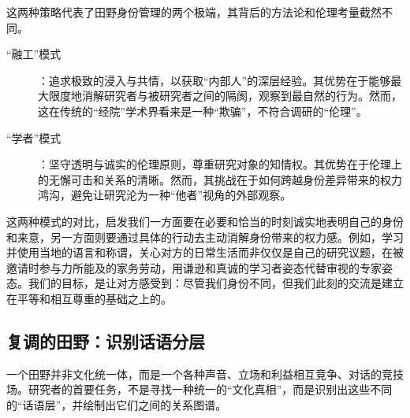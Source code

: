 \documentclass[UTF8]{ctexart}
\begin{document}
这两种策略代表了田野身份管理的两个极端，其背后的方法论和伦理考量截然不同。
\begin{description}
    \item[“融工”模式]：追求极致的浸入与共情，以获取“内部人”的深层经验。其优势在于能够最大限度地消解研究者与被研究者之间的隔阂，观察到最自然的行为。然而，这在传统的“经院”学术界看来是一种“欺骗”，不符合调研的“伦理”。
    \item[“学者”模式]：坚守透明与诚实的伦理原则，尊重研究对象的知情权。其优势在于伦理上的无懈可击和关系的清晰。然而，其挑战在于如何跨越身份差异带来的权力鸿沟，避免让研究沦为一种“他者”视角的外部观察。
\end{description}
这两种模式的对比，启发我们一方面要在必要和恰当的时刻诚实地表明自己的身份和来意，另一方面则要通过具体的行动去主动消解身份带来的权力感。例如，学习并使用当地的语言和称谓，关心对方的日常生活而非仅仅是自己的研究议题，在被邀请时参与力所能及的家务劳动，用谦逊和真诚的学习者姿态代替审视的专家姿态。我们的目标，是让对方感受到：尽管我们身份不同，但我们此刻的交流是建立在平等和相互尊重的基础之上的。

\subsection{复调的田野：识别话语分层}
一个田野并非文化统一体，而是一个各种声音、立场和利益相互竞争、对话的竞技场。研究者的首要任务，不是寻找一种统一的“文化真相”，而是识别出这些不同的“话语层”，并绘制出它们之间的关系图谱。
\end{document}
